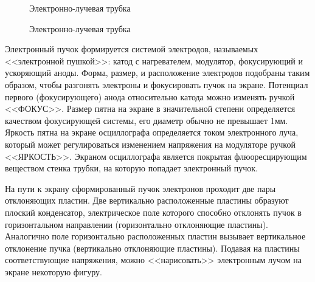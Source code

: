 \documentclass[14pt]{article}
\begin{document}
\begin{figure}[h!]
	\caption{Электронно-лучевая трубка}
	\label{fig:image}
\end{figure}	
\begin{figure}[h!]
	\caption{Электронно-лучевая трубка}
	\label{fig:image}
\end{figure}

Электронный пучок формируется системой электродов, называемых <<электронной пушкой>>: катод с нагревателем, модулятор, фокусирующий и ускоряющий аноды. Форма, размер, и расположение электродов подобраны таким образом, чтобы разгонять электроны и фокусировать пучок на экране. Потенциал первого (фокусирующего) анода относительно катода можно изменять ручкой <<ФОКУС>>. Размер пятна на экране в значительной степени определяется качеством фокусирующей системы, его диаметр обычно не превышает 1мм. Яркость пятна на экране осциллографа определяется током электронного луча, который может регулироваться изменением напряжения на модуляторе ручкой <<ЯРКОСТЬ>>. Экраном осциллографа является покрытая флюоресцирующим веществом стенка трубки, на которую попадает электронный пучок.

На пути к экрану сформированный пучок электронов проходит две пары отклоняющих пластин. Две вертикально расположенные пластины образуют плоский конденсатор, электрическое поле которого способно отклонять пучок в горизонтальном направлении (горизонтально отклоняющие пластины). Аналогично поле горизонтально расположенных пластин вызывает вертикальное отклонение пучка (вертикально отклоняющие пластины). Подавая на пластины соответствующие напряжения, можно <<нарисовать>> электронным лучом на экране некоторую фигуру. 
\end{document}
